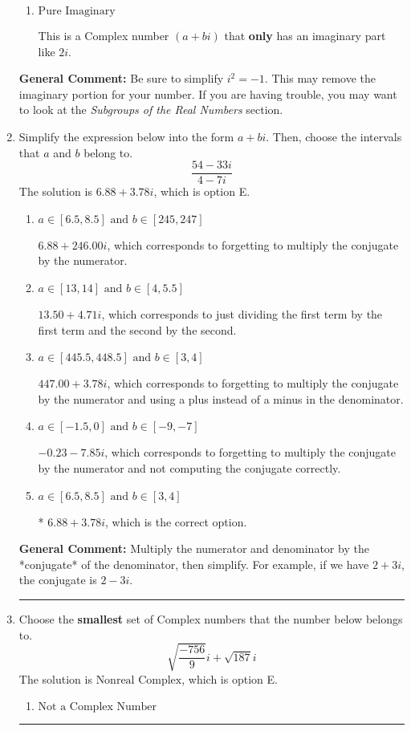 \documentclass{extbook}[14pt]
\newcommand{\litem}[1]{\item #1

\rule{\textwidth}{0.4pt}}
\begin{document}
\begin{enumerate}
{\begin{enumerate}[label=\Alph*.]
This is a Complex number $(a+bi)$ that is not Real (has $i$ as part of the number).
\item \( \text{Pure Imaginary} \)

This is a Complex number $(a+bi)$ that \textbf{only} has an imaginary part like $2i$.
\end{enumerate}

\textbf{General Comment:} Be sure to simplify $i^2 = -1$. This may remove the imaginary portion for your number. If you are having trouble, you may want to look at the \textit{Subgroups of the Real Numbers} section.
}
\litem{
Simplify the expression below into the form $a+bi$. Then, choose the intervals that $a$ and $b$ belong to.
\[ \frac{54 - 33 i}{4 - 7 i} \]
The solution is \( 6.88  + 3.78 i \), which is option E.\begin{enumerate}[label=\Alph*.]
\item \( a \in [6.5, 8.5] \text{ and } b \in [245, 247] \)

 $6.88  + 246.00 i$, which corresponds to forgetting to multiply the conjugate by the numerator.
\item \( a \in [13, 14] \text{ and } b \in [4, 5.5] \)

 $13.50  + 4.71 i$, which corresponds to just dividing the first term by the first term and the second by the second.
\item \( a \in [445.5, 448.5] \text{ and } b \in [3, 4] \)

 $447.00  + 3.78 i$, which corresponds to forgetting to multiply the conjugate by the numerator and using a plus instead of a minus in the denominator.
\item \( a \in [-1.5, 0] \text{ and } b \in [-9, -7] \)

 $-0.23  - 7.85 i$, which corresponds to forgetting to multiply the conjugate by the numerator and not computing the conjugate correctly.
\item \( a \in [6.5, 8.5] \text{ and } b \in [3, 4] \)

* $6.88  + 3.78 i$, which is the correct option.
\end{enumerate}

\textbf{General Comment:} Multiply the numerator and denominator by the *conjugate* of the denominator, then simplify. For example, if we have $2+3i$, the conjugate is $2-3i$.
}
\litem{
Choose the \textbf{smallest} set of Complex numbers that the number below belongs to.
\[ \sqrt{\frac{-756}{9}} i+\sqrt{187}i \]
The solution is \( \text{Nonreal Complex} \), which is option E.\begin{enumerate}[label=\Alph*.]
\item \( \text{Not a Complex Number} \)


\end{enumerate}}
\end{enumerate}
\end{document}
